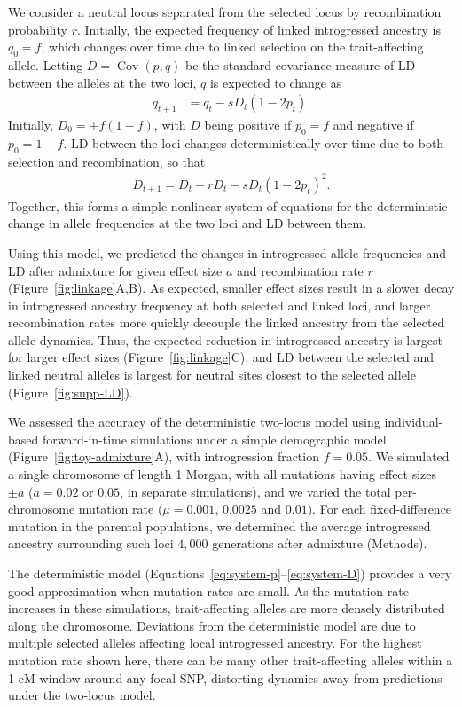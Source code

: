 \documentclass{article}
\DeclareMathOperator{\Cov}{Cov}
\begin{document}
We consider a neutral locus separated from the selected locus by recombination
probability $r$. Initially, the expected frequency of linked introgressed
ancestry is \(q_0=f\), which changes over time due to linked selection on the
trait-affecting allele. Letting \(D=\Cov(p,q)\) be the standard covariance
measure of LD between the alleles at the two loci, $q$ is expected to change as
\begin{align}\label{eq:system-q}
    q_{t+1} & = q_t - s D_t(1-2p_t).
\end{align}
Initially, \(D_0=\pm f(1-f)\), with \(D\) being
positive if \(p_0=f\) and negative if \(p_0=1-f\). LD between the loci changes
deterministically over time due to both selection and recombination, so that
\begin{align}\label{eq:system-D}
    D_{t+1} = D_t - r D_t - s D_t (1-2p_t)^2.
\end{align}
Together, this forms a
simple nonlinear system of equations for the deterministic change in allele
frequencies at the two loci and LD between them.

Using this model, we predicted the changes in introgressed allele frequencies
and LD after admixture for given effect size $a$ and recombination rate $r$
(Figure~\ref{fig:linkage}A,B). As expected, smaller effect sizes result in a
slower decay in introgressed ancestry frequency at both selected and linked
loci, and larger recombination rates more quickly decouple the linked ancestry
from the selected allele dynamics. Thus, the expected reduction in introgressed
ancestry is largest for larger effect sizes (Figure~\ref{fig:linkage}C), and LD
between the selected and linked neutral alleles is largest for neutral sites
closest to the selected allele (Figure~\ref{fig:supp-LD}).

We assessed the accuracy of the deterministic two-locus model using
individual-based forward-in-time simulations \citep{thornton2019polygenic}
under a simple demographic model (Figure~\ref{fig:toy-admixture}A), with
introgression fraction \(f=0.05\). We simulated a single chromosome of length 1
Morgan, with all mutations having effect sizes \(\pm a\) (\(a=0.02\) or
\(0.05\), in separate simulations), and we varied the total per-chromosome
mutation rate (\(\mu=0.001\), \(0.0025\) and \(0.01\)). For each
fixed-difference mutation in the parental populations, we determined the
average introgressed ancestry surrounding such loci $4{,}000$ generations after
admixture (Methods).

The deterministic model (Equations~\ref{eq:system-p}--\ref{eq:system-D})
provides a very good approximation when mutation rates are small. As the
mutation rate increases in these simulations, trait-affecting alleles are more
densely distributed along the chromosome. Deviations from the deterministic
model are due to multiple selected alleles affecting local introgressed
ancestry. For the highest mutation rate shown here, there can be many other
trait-affecting alleles within a 1 cM window around any focal SNP, distorting
dynamics away from predictions under the two-locus model.
\end{document}

